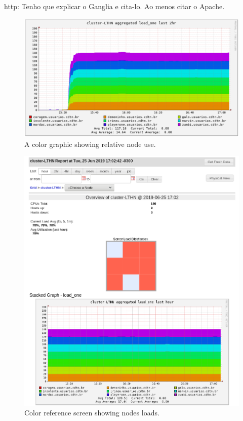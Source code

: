 \documentclass[twoside,a4paper,12pt,english]{inac19}
\begin{document}
http: Tenho que explicar o Ganglia\cite{ganglia} e cita-lo. Ao menos citar o Apache\cite{apache}.

\begin{figure}[h] %
  \centering\includegraphics[scale=0.55]{images/ganglia_rainbow.png}
  \caption{A color graphic showing relative node use.}
  \label{fig:ganglia-rainbow}
\end{figure}

\begin{figure}[h] %
  \centering\includegraphics[scale=0.7]{images/ganglia_colors.png}
  \caption{Color reference screen showing nodes loads.}
  \label{fig:ganglia-colors}
\end{figure}
\end{document}
